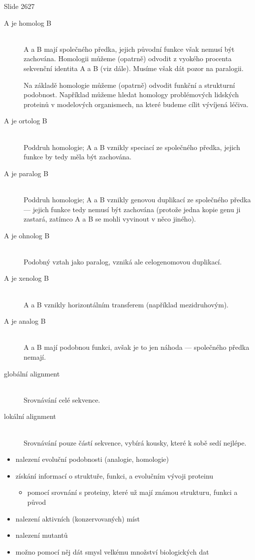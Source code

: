 \documentclass[DIV=8]{scrreprt}
\begin{document}
Slide 2627
\begin{description}
\item[A je homolog B]\hfill \\
A a B mají společného předka, jejich původní funkce však nemusí být zachována. Homologii můžeme (opatrně) odvodit z vyokého procenta sekvenční identita A a B (viz dále). Musíme však dát pozor na paralogii.

Na základě homologie můžeme (opatrně) odvodit funkční a strukturní podobnost. Například můžeme hledat homology problémových lidských proteinů v modelových organismech, na které budeme cílit vývíjená léčiva.


\item[A je ortolog B]\hfill \\
Poddruh homologie; A a B vznikly speciací ze společného předka, jejich funkce by tedy měla být zachována.


\item[A je paralog B]\hfill \\
Poddruh homologie; A a B vznikly genovou duplikací ze společného
předka --- jejich funkce tedy nemusí být zachována
(protože jedna kopie genu ji zastará, zatímco A a B se mohli vyvinout v něco jiného).


\item[A je ohnolog B]\hfill \\
Podobný vztah jako paralog, vzniká ale celogenomovou duplikací.


\item[A je xenolog B]\hfill \\
A a B vznikly horizontálním transferem (například mezidruhovým).


\item[A je analog B]\hfill \\
A a B mají podobnou funkci, avšak je to jen náhoda --- společného předka nemají.


\item[globální alignment]\hfill \\
Srovnávání celé sekvence.


\item[lokální alignment]\hfill \\
Srovnávání pouze částí sekvence, vybírá kousky, které k sobě sedí nejlépe.

\end{description}


\begin{itemize}
    \item nalezení evoluční podobnosti (analogie, homologie)
    \item získání informací o struktuře, funkci, a evolučním vývoji proteinu
\begin{itemize}
    \item pomocí srovnání s proteiny, které už mají známou strukturu, funkci a původ
\end{itemize}

    \item nalezení aktivních (konzervovaných) míst
    \item nalezení mutantů
    \item možno pomocí něj dát smysl velkému množství biologických dat
\end{itemize}
\end{document}
